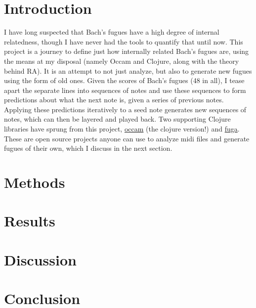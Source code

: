 \documentclass[11pt]{article}
\begin{document}
\maketitle

\section{Introduction}

I have long suspected that Bach's fugues have a high degree of internal relatedness, though I have never had the tools to quantify that until now.  This project is a journey to define just how internally related Bach's fugues are, using the means at my disposal (namely Occam and Clojure, along with the theory behind RA).  It is an attempt to not just analyze, but also to generate new fugues using the form of old ones.  Given the scores of Bach's fugues (48 in all), I tease apart the separate lines into sequences of notes and use these sequences to form predictions about what the next note is, given a series of previous notes.  Applying these predictions iteratively to a seed note generates new sequences of notes, which can then be layered and played back.  Two supporting Clojure libraries have sprung from this project, \href{http://github.com/prismofeverything/occam}{occam} (the clojure version!) and \href{http://github.com/prismofeverything/fuga}{fuga}.  These are open source projects anyone can use to analyze midi files and generate fugues of their own, which I discuss in the next section.  

\section{Methods}



\section{Results}

\section{Discussion}

\section{Conclusion}
\end{document}
